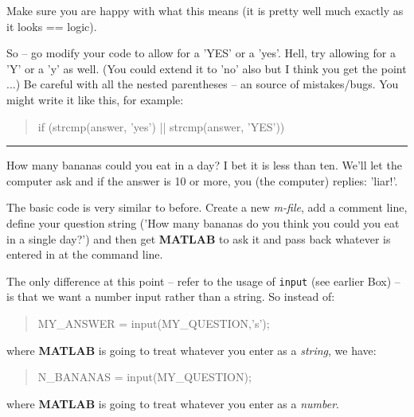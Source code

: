 \documentclass{tufte-book} %
\newenvironment{docspec}{\begin{quotation}\ttfamily\parskip0pt\parindent0pt\ignorespaces}{\end{quotation}}
\begin{document}
Make sure you are happy with what this means (it is pretty well much exactly as it looks == logic).

So -- go modify your code to allow for a 'YES' or a 'yes'. Hell, try allowing for  a 'Y' or a 'y' as well. (You could extend it to 'no' also but I think you get the point ...) Be careful with all the nested parentheses -- an source of mistakes/bugs. You might write it like this, for example: 

\begin{docspec}
if (strcmp(answer, 'yes') || strcmp(answer, 'YES'))
\end{docspec}

\vspace{1mm}
\noindent\rule{4cm}{0.5pt}


How many bananas could you eat in a day? I bet it is less than ten. We'll let the computer ask and if the answer is 10 or more, you (the computer) replies: 'liar!'.

The basic code is very similar to before. Create a new \textit{m-file}, add a comment line, define your question string ('How many bananas do you think you could you eat in a single day?') and then get \textbf{MATLAB} to ask it and pass back whatever is entered in at the command line. 

The only difference at this point -- refer to the usage of \texttt{input} (see earlier Box) -- is that we want a number input rather than a string. So instead of:
\begin{docspec}
MY\_ANSWER = input(MY\_QUESTION,'s');
\end{docspec}
where \textbf{MATLAB} is going to treat whatever you enter as a \textit{string}, we have:
\begin{docspec}
N\_BANANAS = input(MY\_QUESTION);
\end{docspec}
where \textbf{MATLAB} is going to treat whatever you enter as a \textit{number}.
\end{document}
